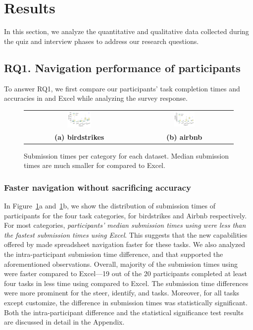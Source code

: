 \section{Results}
\label{sec:results}
In this section, we analyze the quantitative and 
qualitative data collected during the quiz and interview phases 
to address our research questions. 

\subsection{RQ1. Navigation performance of participants}
\label{sec:rq1}
To answer RQ1, we first compare our participants’ task completion times  
and accuracies in \noah and Excel while analyzing the survey response.  
\begin{figure}[t]
   \centering
\begin{tabular}{c c}  %
 \includegraphics[width=0.23\textwidth,trim={18 37 20 15},clip]{images/bird_box.pdf} &
   \includegraphics[width=0.23\textwidth,trim={18 37 20 15},clip]{images/airbnb_box.pdf} \\
   \textbf{(a) birdstrikes} & \textbf{(b) airbnb} \\
\end{tabular}
\caption{Submission times per category for each dataset. Median submission times are much smaller for \noah compared to Excel.}
\label{fig:timeBox}
\end{figure}

\subsubsection{Faster navigation without sacrificing accuracy}
In Figure~\ref{fig:timeBox}a and~\ref{fig:timeBox}b, 
we show the distribution of submission times of participants 
for the four task categories, for birdstrikes and Airbnb respectively. 
For most categories, 
\emph{participants' median submission times using \noah 
were less than the fastest submission times using Excel}. This suggests that
the new capabilities offered by \noah
made spreadsheet navigation faster for these tasks. We also analyzed the intra-participant submission time difference, and that supported the aforementioned observations. Overall, majority of the submission times using \noah were faster compared to Excel---19 out of the 20 participants completed at least four tasks in less time using \noah compared to Excel. The submission time differences were more prominent for the steer, identify, and \cmpB tasks. Moreover, for all tasks except customize, the difference in submission times was statistically significant. Both the intra-participant difference and the statistical significance test results are discussed in detail in the Appendix.

